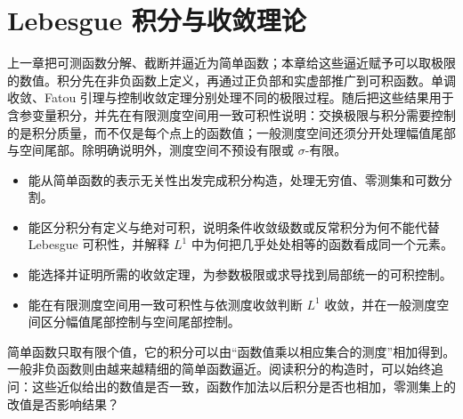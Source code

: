 \chapter{Lebesgue 积分与收敛理论}
\label{b1:ch:05}

\begin{chapterabstract}
上一章把可测函数分解、截断并逼近为简单函数；本章给这些逼近赋予可以取极限的数值。积分先在非负函数上定义，再通过正负部和实虚部推广到可积函数。单调收敛、Fatou 引理与控制收敛定理分别处理不同的极限过程。随后把这些结果用于含参变量积分，并先在有限测度空间用一致可积性说明：交换极限与积分需要控制的是积分质量，而不仅是每个点上的函数值；一般测度空间还须分开处理幅值尾部与空间尾部。除明确说明外，测度空间不预设有限或 \(\sigma\)-有限。
\end{chapterabstract}

\begin{learninggoals}
\begin{itemize}
\item\label{b1:item:0500-goal-1}能从简单函数的表示无关性出发完成积分构造，处理无穷值、零测集和可数分割。
\item\label{b1:item:0500-goal-2}能区分积分有定义与绝对可积，说明条件收敛级数或反常积分为何不能代替 Lebesgue 可积性，并解释 \(L^1\) 中为何把几乎处处相等的函数看成同一个元素。
\item\label{b1:item:0500-goal-3}能选择并证明所需的收敛定理，为参数极限或求导找到局部统一的可积控制。
\item\label{b1:item:0500-goal-4}能在有限测度空间用一致可积性与依测度收敛判断 \(L^1\) 收敛，并在一般测度空间区分幅值尾部控制与空间尾部控制。
\end{itemize}
\end{learninggoals}

简单函数只取有限个值，它的积分可以由“函数值乘以相应集合的测度”相加得到。一般非负函数则由越来越精细的简单函数逼近。阅读积分的构造时，可以始终追问：这些近似给出的数值是否一致，函数作加法以后积分是否也相加，零测集上的改值是否影响结果？

